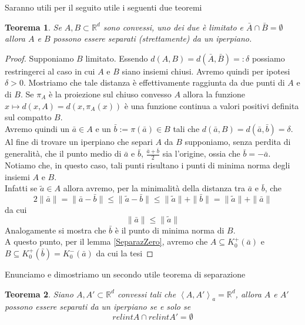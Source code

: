 \documentclass[a4paper,12pt,italian]{article}
\newcommand{\Rd}{\mathbb{R}^d}
\newtheorem{teo}{Teorema}
\begin{document}
Saranno utili per il seguito utile i seguenti due teoremi
\begin{teo} %
\label{SeparazTeo1}
Se $A,B\subset\Rd$ sono convessi, uno dei due \`e limitato e $\bar{A}\cap\bar{B}=\emptyset$ allora $A$ e $B$ possono essere separati
(strettamente) da un iperpiano.
\end{teo}
\begin{proof} %
Supponiamo $B$ limitato. Essendo $d(A,B)=d(\bar{A},\bar{B})=:\delta$ possiamo restringerci al caso in cui $A$ e $B$ siano
insiemi chiusi. Avremo quindi per ipotesi $\delta>0$. Mostriamo che tale distanza \`e effettivamente raggiunta da due punti di $A$ e di $B$.
Se $\pi_A$ \`e la proiezione sul chiuso convesso $A$ allora la funzione $x\mapsto d(x,A)=d(x,\pi_A(x))$ \`e una funzione continua a valori
positivi definita sul compatto $B$.\\
Avremo quindi un $\bar{a}\in A$ e un $\bar{b}:=\pi(\bar{a})\in B$ tali che $d(\bar{a},B)=d(\bar{a},\bar{b})=\delta$. Al fine di trovare
un iperpiano che separi $A$ da $B$ supponiamo, senza perdita di generalit\`a, che il punto medio di $\bar{a}$ e $\bar{b}$, 
$\frac{\bar{a}+\bar{b}}{2}$ sia l'origine, ossia che $\bar{b}=-\bar{a}$.
Notiamo che, in questo caso, tali punti risultano i punti di minima norma degli insiemi $A$ e $B$.\\
Infatti se $\tilde{a}\in A$ allora avremo, per la minimalit\`a della distanza tra $\bar{a}$ e $\bar{b}$, che
\begin{equation*}
2\|\bar{a}\|=\|\bar{a}-\bar{b}\|\leq\|\tilde{a}-\bar{b}\|\leq\|\tilde{a}\|+\|\bar{b}\|=\|\tilde{a}\|+\|\bar{a}\|
\end{equation*}
da cui
\begin{equation*}
\|\bar{a}\|\leq\|\tilde{a}\|
\end{equation*}
Analogamente si mostra che $\bar{b}$ \`e il punto di minima norma di $B$.\\
A questo punto, per il lemma \ref{SeparazZero}, avremo che $A\subseteq K^+_0(\bar{a})$ e $B\subseteq K^+_0(\bar{b})=K^-_0(\bar{a})$ da cui
la tesi
\end{proof}
Enunciamo e dimostriamo un secondo utile teorema di separazione
\begin{teo}
\label{SeparazTeo2}
Siano $A,A'\subset\Rd$ convessi tali che $\left<A,A'\right>_a=\Rd$, allora $A$ e $A'$ possono essere separati da un iperpiano se e solo se
\begin{equation}
relintA\cap relintA'=\emptyset
\end{equation}
\end{teo}
\end{document}
